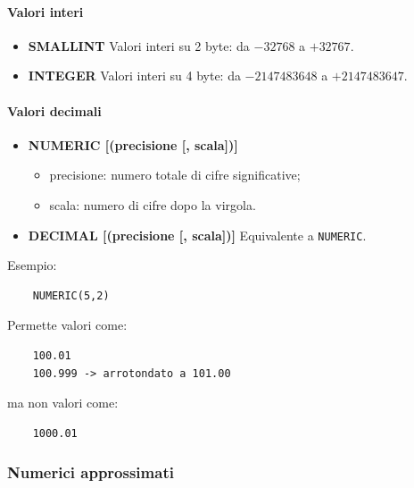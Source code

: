 \paragraph{Valori interi}

\begin{itemize}
	
	\item \textbf{SMALLINT}  
	Valori interi su 2 byte: da $-32768$ a $+32767$.
	
	\item \textbf{INTEGER}  
	Valori interi su 4 byte: da $-2147483648$ a $+2147483647$.
	
\end{itemize}

\paragraph{Valori decimali}

\begin{itemize}
	
	\item \textbf{NUMERIC [(precisione [, scala])]}  
	\begin{itemize}
		\item precisione: numero totale di cifre significative;
		\item scala: numero di cifre dopo la virgola.
	\end{itemize}
	
	\item \textbf{DECIMAL [(precisione [, scala])]}  
	Equivalente a \texttt{NUMERIC}.
\end{itemize}

Esempio:

\begin{verbatim}
	NUMERIC(5,2)
\end{verbatim}

Permette valori come:

\begin{verbatim}
	100.01
	100.999 -> arrotondato a 101.00
\end{verbatim}

ma non valori come:

\begin{verbatim}
	1000.01
\end{verbatim}

\subsubsection*{Numerici approssimati}


